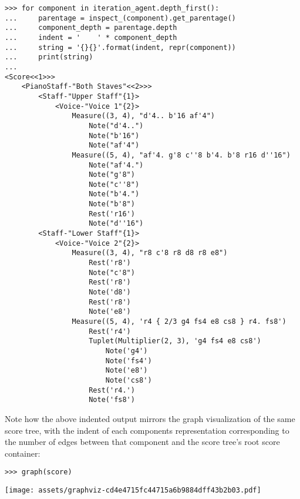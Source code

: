 \begin{abjadbookoutput}
\begin{singlespacing}
\vspace{-0.5\baselineskip}
\begin{lstlisting}
>>> for component in iteration_agent.depth_first():
...     parentage = inspect_(component).get_parentage()
...     component_depth = parentage.depth
...     indent = '    ' * component_depth
...     string = '{}{}'.format(indent, repr(component))
...     print(string)
...
<Score<<1>>>
    <PianoStaff-"Both Staves"<<2>>>
        <Staff-"Upper Staff"{1}>
            <Voice-"Voice 1"{2}>
                Measure((3, 4), "d'4.. b'16 af'4")
                    Note("d'4..")
                    Note("b'16")
                    Note("af'4")
                Measure((5, 4), "af'4. g'8 c''8 b'4. b'8 r16 d''16")
                    Note("af'4.")
                    Note("g'8")
                    Note("c''8")
                    Note("b'4.")
                    Note("b'8")
                    Rest('r16')
                    Note("d''16")
        <Staff-"Lower Staff"{1}>
            <Voice-"Voice 2"{2}>
                Measure((3, 4), "r8 c'8 r8 d8 r8 e8")
                    Rest('r8')
                    Note("c'8")
                    Rest('r8')
                    Note('d8')
                    Rest('r8')
                    Note('e8')
                Measure((5, 4), 'r4 { 2/3 g4 fs4 e8 cs8 } r4. fs8')
                    Rest('r4')
                    Tuplet(Multiplier(2, 3), 'g4 fs4 e8 cs8')
                        Note('g4')
                        Note('fs4')
                        Note('e8')
                        Note('cs8')
                    Rest('r4.')
                    Note('fs8')
\end{lstlisting}
\end{singlespacing}
\end{abjadbookoutput}

\noindent Note how the above indented output mirrors the graph visualization of
the same score tree, with the indent of each components representation
corresponding to the number of edges between that component and the score
tree's root score container:

\begin{comment}
<abjad>
graph(score)
</abjad>
\end{comment}

\begin{abjadbookoutput}
\begin{singlespacing}
\vspace{-0.5\baselineskip}
\begin{lstlisting}
>>> graph(score)
\end{lstlisting}
\noindent\texttt{[image: assets/graphviz-cd4e4715fc44715a6b9884dff43b2b03.pdf]}
\end{singlespacing}
\end{abjadbookoutput}

